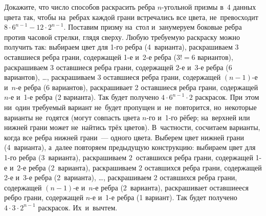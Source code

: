 \problem
Докажите, что число способов раскрасить ребра $n$-угольной призмы в~4 данных
цвета так, чтобы на~ребрах каждой грани встречались все цвета, не~превосходит
$8 \cdot 6^{n-1} - 12 \cdot 2^{n-1}$.
\solution
Поставим призму на~стол и~занумеруем боковые ребра против часовой стрелки,
глядя сверху.
Любую требуемую раскраску можно получить так:
выбираем цвет для 1-го ребра (4~варианта),
раскрашиваем 3 оставшиеся ребра грани, содержащей 1-е и~2-е ребра
($3! = 6$ вариантов),
раскрашиваем 3 оставшиеся ребра грани, содержащей 2-е и~3-е ребра
(6 вариантов),
\ldots,
раскрашиваем 3 оставшиеся ребра грани, содержащей $(n-1)$-е и~$n$-е ребра
(6 вариантов),
раскрашивает 2 оставшиеся ребра грани, содержащей $n$-е и~1-е ребра
(2 варианта).
Так будет получено $4 \cdot 6^{n-1} \cdot 2$ раскрасок.
При этом ни~один требуемый вариант не~будет пропущен и~не~повторится,
но~некоторые варианты не~годятся 
(могут совпасть цвета $n$-го и~1-го рёбер; на~верхней или нижней грани может
не~найтись трёх цветов).
В~частности, сосчитаем варианты, когда все ребра нижней грани~--- одного цвета.
Выберем цвет нижней грани (4~варианта), а~далее повторяем предыдущую
конструкцию: выбираем цвет для 1-го ребра (3~варианта),
раскрашиваем 2~оставшихся ребра грани, содержащей 1-е и~2-е ребра (2~варианта),
раскрашиваем 2 оставшихся ребра грани, содержащей 2-е и~3-е ребра (2~варианта),
\ldots,
раскрашиваем 2 оставшихся ребра грани, содержащей $(n-1)$-е и~$n$-е ребра
(2~варианта),
раскрашивает оставшиееся ребро грани, содержащей $n$-е и~1-е ребра
(1 вариант).
Так будет получено $4 \cdot 3 \cdot 2^{n-1}$ раскрасок.
Их~и~вычтем.
\endproblem
